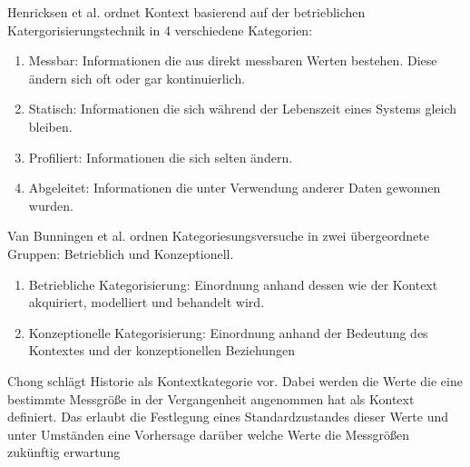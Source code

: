 Henricksen et al.\cite{henricksen2003framework} ordnet Kontext basierend auf der betrieblichen Katergorisierungstechnik in 4 verschiedene Kategorien:
\begin{enumerate}
\item {Messbar: Informationen die aus direkt messbaren Werten bestehen. Diese ändern sich oft oder gar kontinuierlich. }
\item {Statisch: Informationen die sich während der Lebenszeit eines Systems gleich bleiben.}
\item {Profiliert: Informationen die sich selten ändern.}
\item {Abgeleitet: Informationen die unter Verwendung anderer Daten gewonnen wurden. }

\end{enumerate}

Van Bunningen et al. \cite{van2005context} ordnen Kategoriesungsversuche in zwei übergeordnete Gruppen: Betrieblich und Konzeptionell. 
\begin{enumerate}
\item{Betriebliche Kategorisierung: Einordnung anhand dessen wie der Kontext akquiriert, modelliert und behandelt wird.}
\item{Konzeptionelle Kategorisierung: Einordnung anhand der Bedeutung des Kontextes und der konzeptionellen Beziehungen} %
\end{enumerate}
Chong\cite{chong_context-aware_nodate} schlägt Historie als Kontextkategorie vor. Dabei werden die Werte die eine bestimmte Messgröße in der Vergangenheit angenommen hat als Kontext definiert. Das erlaubt die Festlegung eines Standardzustandes dieser Werte und unter Umständen eine Vorhersage darüber welche Werte die Messgrößen zukünftig erwartung
